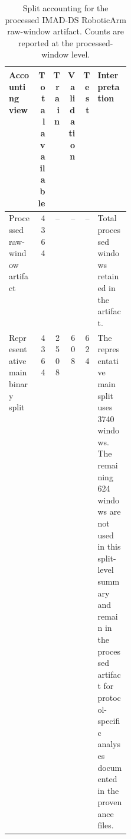 
\begin{table}[!htbp]
\centering
\scriptsize
\setlength{\tabcolsep}{3.8pt}
\renewcommand{\arraystretch}{1.10}
\caption{Split accounting for the processed IMAD-DS RoboticArm raw-window artifact. Counts are reported at the processed-window level.}
\label{tab:split-accounting}
\begin{tabularx}{\linewidth}{@{}>{\RaggedRight\arraybackslash}p{0.24\linewidth}rrrr>{\RaggedRight\arraybackslash}X@{}}
\toprule
Accounting view & Total available & Train & Validation & Test & Interpretation \\
\midrule
Processed raw-window artifact & 4364 & -- & -- & -- & Total processed windows retained in the artifact. \\
Representative main binary split & 4364 & 2508 & 608 & 624 & The representative main split uses 3740 windows. The remaining 624 windows are not used in this split-level summary and remain in the processed artifact for protocol-specific analyses documented in the provenance files. \\
\bottomrule
\end{tabularx}
\end{table}
